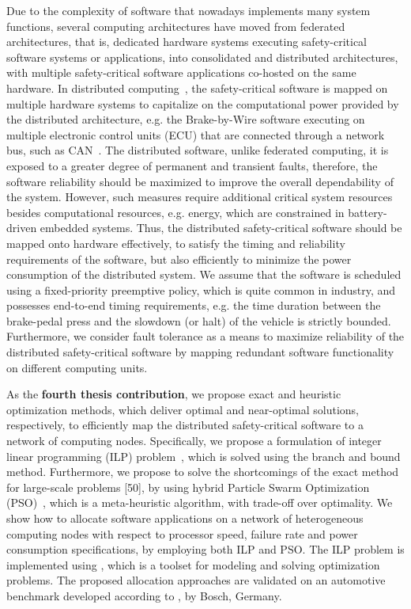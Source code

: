 Due to the complexity of software that nowadays implements many system functions, several computing architectures have moved from federated architectures, that is, dedicated hardware systems executing safety-critical software systems or applications, into consolidated and distributed architectures, with multiple safety-critical software applications co-hosted on the same hardware. In distributed computing~\cite{Kopetz2003Real-timeApplications}, the safety-critical
software is mapped on multiple hardware systems to capitalize on the computational power provided by the distributed architecture, e.g. the Brake-by-Wire software executing on multiple electronic control units (ECU) that are connected through a network bus, such as CAN~\cite{Davis2007ControllerRevised}. The distributed software, unlike federated computing, it is exposed to a greater degree of permanent and transient faults, therefore, the software reliability should be maximized to improve the overall dependability of the system. However, such measures require additional critical system resources besides computational resources, e.g. energy, which are constrained in battery-driven embedded systems. Thus, the distributed safety-critical software should be mapped onto hardware effectively, to satisfy the timing and reliability requirements of the software, but also efficiently to minimize the power consumption of the distributed system. We assume that the software is scheduled using a fixed-priority preemptive policy, which is quite common in industry, and possesses end-to-end timing requirements, e.g. the time duration between the brake-pedal press and the slowdown (or halt) of the vehicle is strictly bounded. Furthermore, we consider fault tolerance as a means to maximize reliability of the distributed safety-critical software by mapping redundant software functionality on different computing units.
 
As the \textbf{fourth thesis contribution}, we propose exact and heuristic optimization methods, which deliver optimal and near-optimal solutions, respectively, to efficiently map the distributed safety-critical software to a network of computing nodes. Specifically, we propose a formulation of integer linear programming (ILP) problem~\cite{Mahmud5222}, which is solved using the branch and bound method. Furthermore, we propose to solve the shortcomings of the exact method for large-scale problems [50], by using hybrid Particle Swarm Optimization (PSO)~\cite{Mirjalili2019ParticleOptimisation}, which is a meta-heuristic algorithm, with trade-off over optimality. We show how to allocate \autosar{} software applications on a network of heterogeneous computing nodes with respect to processor speed, failure rate and power consumption specifications, by employing both ILP and PSO. The ILP problem is implemented using \ilogcplex, which is a toolset for modeling and solving optimization problems. The proposed allocation approaches are validated on an automotive benchmark developed according to \autosar, by Bosch, Germany.

